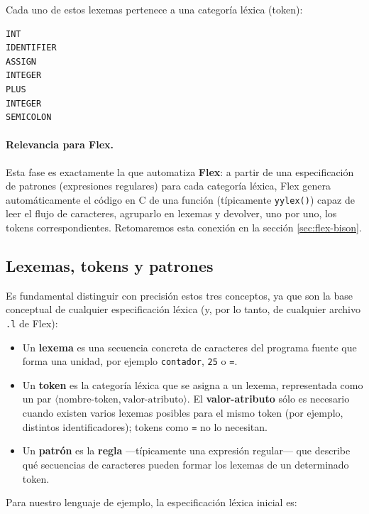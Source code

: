 \documentclass[11pt,a4paper]{article}
\begin{document}
Cada uno de estos lexemas pertenece a una categoría léxica (token):

\begin{lstlisting}
INT
IDENTIFIER
ASSIGN
INTEGER
PLUS
INTEGER
SEMICOLON
\end{lstlisting}

\paragraph{Relevancia para Flex.} Esta fase es exactamente la que automatiza \textbf{Flex}: a
partir de una especificación de patrones (expresiones regulares) para cada categoría léxica,
Flex genera automáticamente el código en C de una función (típicamente \texttt{yylex()}) capaz
de leer el flujo de caracteres, agruparlo en lexemas y devolver, uno por uno, los tokens
correspondientes. Retomaremos esta conexión en la sección \ref{sec:flex-bison}.

\subsection{Lexemas, tokens y patrones}
\label{sec:lexemas-tokens-patrones}

Es fundamental distinguir con precisión estos tres conceptos, ya que son la base conceptual de
cualquier especificación léxica (y, por lo tanto, de cualquier archivo \texttt{.l} de Flex):

\begin{itemize}
    \item Un \textbf{lexema} es una secuencia concreta de caracteres del programa fuente que
    forma una unidad, por ejemplo \texttt{contador}, \texttt{25} o \texttt{=}.
    \item Un \textbf{token} es la categoría léxica que se asigna a un lexema, representada como
    un par $\langle \text{nombre-token}, \text{valor-atributo} \rangle$. El
    \textbf{valor-atributo} sólo es necesario cuando existen varios lexemas posibles para el
    mismo token (por ejemplo, distintos identificadores); tokens como \texttt{=} no lo
    necesitan.
    \item Un \textbf{patrón} es la \textbf{regla} —típicamente una expresión regular— que
    describe qué secuencias de caracteres pueden formar los lexemas de un determinado token.
\end{itemize}

Para nuestro lenguaje de ejemplo, la especificación léxica inicial es:
\end{document}
